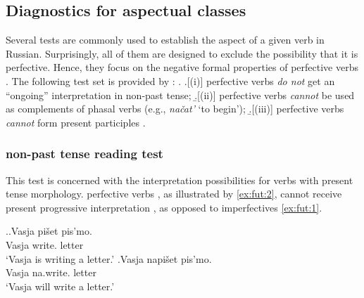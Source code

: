 \subsection{Diagnostics for aspectual classes}\label{sec:tests:old}
Several tests are commonly used  to establish the aspect of a given verb in Russian. Surprisingly, all of them are designed to exclude the possibility that it is perfective. Hence, they focus on the negative formal properties of perfective verbs . The following test set is provided by \citet{Schoorlemmer:95}: 
\ex.\label{tests} \a.[(i)] \label{sttest1} perfective verbs  \textit{do not} get an ``ongoing'' interpretation in non-past  tense; 
\b.[(ii)] \label{sttest2} perfective verbs  \textit{cannot} be used as complements of phasal verbs  (e.g., \textit{na\v{c}at'} `to begin'); 
\b.[(iii)] \label{sttest3} perfective verbs  \textit{cannot} form present participles .

\subsubsection{non-past   tense reading test}
This test is concerned with the interpretation possibilities for verbs with present tense morphology. perfective verbs , as illustrated by \ref{ex:fut:2}, cannot receive present progressive interpretation , as opposed to imperfectives \ref{ex:fut:1}.

\ex.\label{ex:fut}\ag.\label{ex:fut:1}Vasja pi\v{s}et\textsuperscript{\IPF} pis'mo.\\
Vasja write. letter\\
`Vasja is writing a letter.'
\bg.\label{ex:fut:2}Vasja napi\v{s}et\textsuperscript{\PF} pis'mo.\\
Vasja na.write. letter\\
`Vasja will write a letter.'
 
